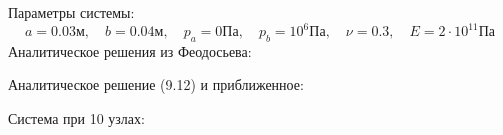 \documentclass[12pt,a4paper]{article}
\begin{document}
Параметры системы:
$$
    a = 0.03 \text{м}, \quad b = 0.04 \text{м},\quad p_a = 0 \text{Па},\quad
    p_b = 10^6 \text{Па},\quad \nu = 0.3,\quad E = 2 \cdot 10^{11}  \text{Па}
$$
Аналитическое решения из Феодосьева:
\begin{figure}[H]
    \label{fig:image}
\end{figure}
Аналитическое решение (9.12) и приближенное:
\begin{figure}[H]
    \label{fig:image}
\end{figure}
Система при 10 узлах:
\begin{figure}[H]
    \label{fig:image}
\end{figure}
\end{document}
